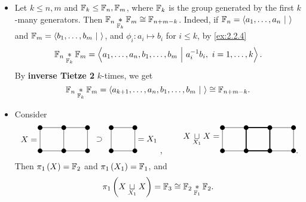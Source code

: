 \begin{example}
\hfill
\begin{itemize}
\item Let $ k \le n, m $ and $ \mathbb{F}_k \le \mathbb{F}_n, \mathbb{F}_m $, where $ \mathbb{F}_k $ is the group generated by the first $ k $-many generators. Then $ \mathbb{F}_n \underset{\mathbb{F}_k}{*} \mathbb{F}_m \cong \mathbb{F}_{n + m - k} $. Indeed, if $ \mathbb{F}_n = \left\langle a_1, \dots, a_n \ \middle| \  \right\rangle $ and $ \mathbb{F}_m = \left\langle b_1, \dots, b_m \ \middle| \  \right\rangle $, and $ \phi_i : a_i \mapsto b_i $ for $ i \le k $, by \ref{ex:2.2.4}
$$ \mathbb{F}_n \underset{\mathbb{F}_k}{*} \mathbb{F}_m = \left\langle a_1, \dots, a_n, b_1, \dots, b_m \ \middle| \  a_i^{-1}b_i, \ i = 1, \dots, k \right\rangle. $$
By \textbf{inverse Tietze 2} $ k $-times, we get
$$ \mathbb{F}_n \underset{\mathbb{F}_k}{*} \mathbb{F}_m = \left\langle a_{k + 1}, \dots, a_n, b_1, \dots, b_m \ \middle| \  \right\rangle \cong \mathbb{F}_{n + m - k}. $$
\item Consider
$$
\begin{tikzpicture}
\draw (0, 0.5) node[left]{$ X = $};
\fill (0, 0) circle (0.1);
\fill (1, 0) circle (0.1);
\fill (2, 0) circle (0.1);
\fill (0, 1) circle (0.1);
\fill (1, 1) circle (0.1);
\fill (2, 1) circle (0.1);
\draw (0, 0) to (2, 0);
\draw (0, 1) to (2, 1);
\draw (0, 0) to (0, 1);
\draw (1, 0) to (1, 1);
\draw (2, 0) to (2, 1);
\draw (2.5, 0.5) node{$ \supset $};
\fill (3, 0) circle (0.1);
\fill (4, 0) circle (0.1);
\fill (3, 1) circle (0.1);
\fill (4, 1) circle (0.1);
\draw (3, 0) to (4, 0);
\draw (3, 1) to (4, 1);
\draw (3, 0) to (3, 1);
\draw (4, 0) to (4, 1);
\draw (4, 0.5) node[right]{$ = X_1 $};
\end{tikzpicture},
\qquad
\begin{tikzpicture}
\draw (0, 0.5) node[left]{$ X \underset{X_1}{\sqcup} X = $};
\fill (0, 0) circle (0.1);
\fill (1, 0) circle (0.1);
\fill (2, 0) circle (0.1);
\fill (3, 0) circle (0.1);
\fill (0, 1) circle (0.1);
\fill (1, 1) circle (0.1);
\fill (2, 1) circle (0.1);
\fill (3, 1) circle (0.1);
\draw (0, 0) to (1, 0);
\draw [very thick] (1, 0) to (2, 0);
\draw (2, 0) to (3, 0);
\draw (0, 1) to (1, 1);
\draw [very thick] (1, 1) to (2, 1);
\draw (2, 1) to (3, 1);
\draw (0, 0) to (0, 1);
\draw [very thick] (1, 0) to (1, 1);
\draw [very thick] (2, 0) to (2, 1);
\draw (3, 0) to (3, 1);
\end{tikzpicture}.
$$
Then $ \pi_1\br{X} = \FF_2 $ and $ \pi_1\br{X_1} = \FF_1 $, and
$$ \pi_1\br{X \underset{X_1}{\sqcup} X} = \FF_3 \cong \FF_2 \underset{\FF_1}{*} \FF_2. $$
\end{itemize}
\end{example}

